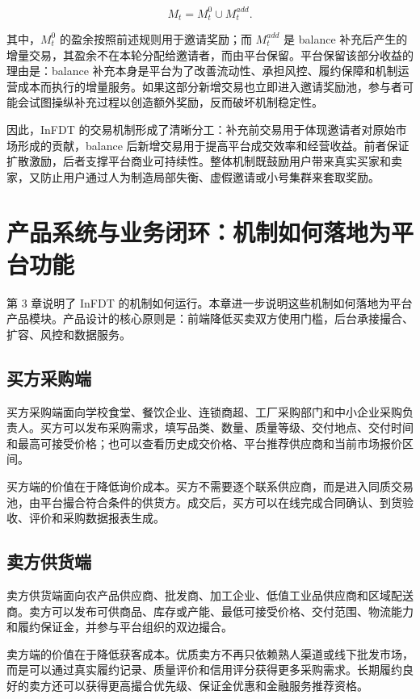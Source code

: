 \documentclass[UTF8,11pt]{ctexart}
\begin{document}
\[
    M_t=M_t^0\cup M_t^{add}.
\]

其中，\(M_t^0\) 的盈余按照前述规则用于邀请奖励；而 \(M_t^{add}\) 是 balance 补充后产生的增量交易，其盈余不在本轮分配给邀请者，而由平台保留。平台保留该部分收益的理由是：balance 补充本身是平台为了改善流动性、承担风控、履约保障和机制运营成本而执行的增量服务。如果这部分新增交易也立即进入邀请奖励池，参与者可能会试图操纵补充过程以创造额外奖励，反而破坏机制稳定性。

因此，InFDT 的交易机制形成了清晰分工：补充前交易用于体现邀请者对原始市场形成的贡献，balance 后新增交易用于提高平台成交效率和经营收益。前者保证扩散激励，后者支撑平台商业可持续性。整体机制既鼓励用户带来真实买家和卖家，又防止用户通过人为制造局部失衡、虚假邀请或小号集群来套取奖励。

\section{产品系统与业务闭环：机制如何落地为平台功能}

第 3 章说明了 InFDT 的机制如何运行。本章进一步说明这些机制如何落地为平台产品模块。产品设计的核心原则是：前端降低买卖双方使用门槛，后台承接撮合、扩容、风控和数据服务。

\subsection{买方采购端}

买方采购端面向学校食堂、餐饮企业、连锁商超、工厂采购部门和中小企业采购负责人。买方可以发布采购需求，填写品类、数量、质量等级、交付地点、交付时间和最高可接受价格；也可以查看历史成交价格、平台推荐供应商和当前市场报价区间。

买方端的价值在于降低询价成本。买方不需要逐个联系供应商，而是进入同质交易池，由平台撮合符合条件的供货方。成交后，买方可以在线完成合同确认、到货验收、评价和采购数据报表生成。

\subsection{卖方供货端}

卖方供货端面向农产品供应商、批发商、加工企业、低值工业品供应商和区域配送商。卖方可以发布可供商品、库存或产能、最低可接受价格、交付范围、物流能力和履约保证金，并参与平台组织的双边撮合。

卖方端的价值在于降低获客成本。优质卖方不再只依赖熟人渠道或线下批发市场，而是可以通过真实履约记录、质量评价和信用评分获得更多采购需求。长期履约良好的卖方还可以获得更高撮合优先级、保证金优惠和金融服务推荐资格。
\end{document}
